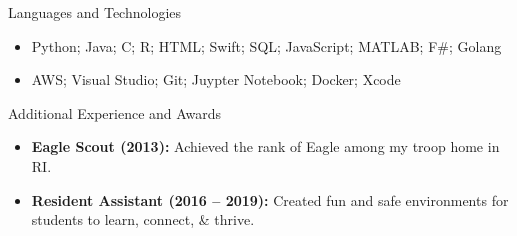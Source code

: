 \documentclass[]{mcdowellcv}
\begin{document}
	\begin{cvsection}{Languages and Technologies}
		\begin{cvsubsection}{}{}{}	
			\begin{itemize}
				\item Python; Java; C; R; HTML; Swift; SQL; JavaScript; MATLAB; F\#; Golang
				\item AWS; Visual Studio; Git; Juypter Notebook; Docker; Xcode
			\end{itemize}
		\end{cvsubsection}
	\end{cvsection}

	\begin{cvsection}{Additional Experience and Awards}
		\begin{cvsubsection}{}{}{}	
			\begin{itemize}
				\item \textbf{Eagle Scout (2013):} Achieved the rank of Eagle among my troop home in RI.
				\item \textbf{Resident Assistant (2016 -- 2019):} Created fun and safe environments for students to learn, connect, \& thrive.
			\end{itemize}
		\end{cvsubsection}
	\end{cvsection}
		
\end{document}
